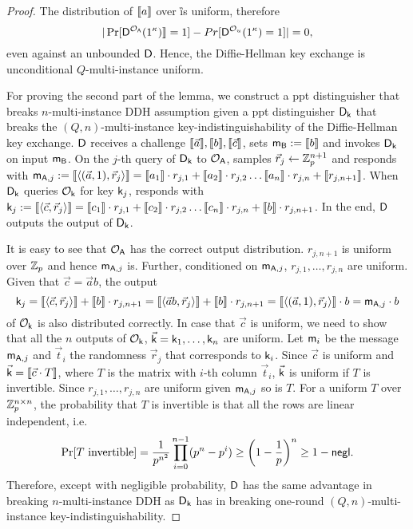 \begin{proof}
The distribution of $\llbracket a\rrbracket$ over \G is uniform, therefore 
$$
|\Pr[ \mathsf D^{\mathcal{O}_{\mathsf{A}}}(1^{\kappa})\rrbracket=1]-Pr[ \mathsf D^{\mathcal{O}_{u}}(1^{\kappa})=1]|=0,
$$
even against an unbounded $\mathsf D$. Hence, the Diffie-Hellman key exchange is unconditional $Q$-multi-instance uniform.

For proving the second part of the lemma, we construct a ppt distinguisher \D that breaks $n$-multi-instance DDH assumption given a ppt distinguisher $\mathsf D_\mathsf{k}$ that breaks the $(Q,n)$-multi-instance key-indistinguishability of the Diffie-Hellman key exchange. $\mathsf D$ receives a challenge $\llbracket \vec{a}\rrbracket,\llbracket b\rrbracket,\llbracket \vec{c}\rrbracket$, sets $\mathsf{m}_{\mathsf{B}}:=\llbracket b\rrbracket$ and invokes $\mathsf D_{\mathsf{k}}$ on input $\mathsf{m}_{\mathsf{B}}$. On the $j$-th query of $\mathsf D_{\mathsf{k}}$ to $\mathcal{O}_{\mathsf{A}}$, \D samples $\vec{r}_j\leftarrow\mathbb Z_p^{n+1}$ and responds with $\mathsf{m}_{\mathsf{A},j}:=\llbracket \langle (\vec{a},1),\vec{r}_j\rangle\rrbracket=\llbracket a_1\rrbracket\cdot{r_{j,1}}+\llbracket a_2\rrbracket\cdot{r_{j,2}}\ldots\llbracket a_n\rrbracket\cdot{r_{j,n}}+\llbracket r_{j,n+1}\rrbracket$. When $\mathsf D_{\mathsf{k}}$ queries $\mathcal{O}_{\mathsf{k}}$ for key $\mathsf{k}_j$, \D responds with $\mathsf{k}_j:=\llbracket \langle\vec{c},\vec{r}_j\rangle\rrbracket=\llbracket c_1\rrbracket\cdot{r_{j,1}}+\llbracket c_2\rrbracket\cdot{r_{j,2}}\ldots\llbracket c_n\rrbracket\cdot{r_{j,n}}+\llbracket b\rrbracket\cdot{r_{j,n+1}}$. In the end, $\mathsf D$ outputs the output of $\mathsf D_{\mathsf{k}}$.

It is easy to see that $\mathcal{O}_{\mathsf{A}}$ has the correct output distribution. $r_{j,n+1}$ is uniform over $\mathbb Z_p$ and hence $\mathsf{m}_{\mathsf{A},j}$ is. Further, conditioned on $\mathsf{m}_{\mathsf{A},j}$, $r_{j,1},\ldots,r_{j,n}$ are uniform. Given that $\vec{c}=\vec{a}b$, the output
$$
\mathsf{k}_j=\llbracket \langle\vec{c},\vec{r}_j\rangle\rrbracket+\llbracket b\rrbracket\cdot{r_{j,n+1}}=\llbracket \langle\vec{a}b,\vec{r}_j\rangle\rrbracket+\llbracket b\rrbracket\cdot{r_{j,n+1}}=\llbracket \langle(\vec{a},1),\vec{r}_j\rangle\rrbracket\cdot b=\mathsf{m}_{\mathsf{A},j}\cdot b
$$
of $\mathcal{O}_{\mathsf{k}}$ is also distributed correctly. In case that $\vec{c}$ is uniform, we need to show that all the $n$ outputs of $\mathcal{O}_{\mathsf{k}}$, $\vec{\mathsf{k}}=\mathsf{k}_1,\ldots,\mathsf{k}_n$ are uniform. Let $\mathsf{m}_i$ be the message $\mathsf{m}_{\mathsf{A},j}$ and $\vec{t}_i$ the randomness $\vec{r}_j$ that corresponds to $\mathsf{k}_i$. Since $\vec{c}$ is uniform and $\vec{\mathsf{k}}=\llbracket \vec{c}\cdot T\rrbracket$, where $T$ is the matrix with $i$-th column $\vec{t}_i$, $\vec{\mathsf{k}}$ is uniform if $T$ is invertible. Since $r_{j,1},\ldots,r_{j,n}$ are uniform given $\mathsf{m}_{\mathsf{A},j}$ so is $T$. For a uniform $T$ over $\mathbb Z_p^{n\times n}$, the probability that $T$ is invertible is that all the rows are linear independent, i.e. 
$$
\Pr[ T\text{ invertible}]= \frac{1}{p^{n^2}}\prod_{i=0}^{n-1}(p^n-p^i)\geq\left(1-\frac{1}{p}\right)^n\geq 1-\mathsf{negl}.
$$ 
Therefore, except with negligible probability, $\mathsf D$ has the same advantage in breaking $n$-multi-instance DDH as $\mathsf D_{\mathsf{k}}$ has in breaking one-round $(Q,n)$-multi-instance key-indistinguishability.
\pe
\end{proof}

